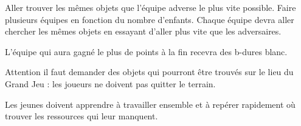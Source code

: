 \documentclass{grand-jeu}
\begin{document}
\begin{regles}

Aller trouver les mêmes objets que l'équipe adverse le plus vite possible. Faire plusieurs équipes en fonction du nombre d'enfants. Chaque équipe devra aller chercher les mêmes objets en essayant d'aller plus vite que les adversaires.

L’équipe qui aura gagné le plus de points à la fin recevra des b-dures blanc.

Attention il faut demander des objets qui pourront être trouvés sur le lieu du Grand Jeu : les joueurs ne doivent pas quitter le terrain. 

\end{regles}

\begin{imaginaire}
Les jeunes doivent apprendre à travailler ensemble et à repérer rapidement où trouver les ressources qui leur manquent. 
\end{imaginaire}

\begin{moments-stop}
\end{moments-stop}
\end{document}
